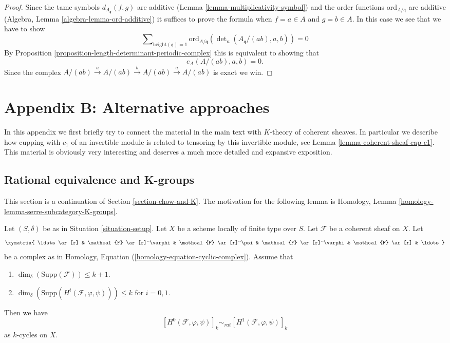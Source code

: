 \begin{proof}
Since the tame symbols $d_{A_{\mathfrak q}}(f, g)$ are additive
(Lemma \ref{lemma-multiplicativity-symbol}) and the order
functions $\text{ord}_{A/\mathfrak q}$
are additive (Algebra, Lemma \ref{algebra-lemma-ord-additive})
it suffices to prove the formula when $f = a \in A$ and
$g = b \in A$. In this case we see that we have to show
$$
\sum\nolimits_{\text{height}(\mathfrak q) = 1}
\text{ord}_{A/\mathfrak q}(\det\nolimits_\kappa(A_{\mathfrak q}/(ab), a, b))
= 0
$$
By Proposition \ref{proposition-length-determinant-periodic-complex}
this is equivalent to showing that
$$
e_A(A/(ab), a, b) = 0.
$$
Since the complex
$A/(ab) \xrightarrow{a} A/(ab) \xrightarrow{b} A/(ab) \xrightarrow{a} A/(ab)$
is exact we win.
\end{proof}





\section{Appendix B: Alternative approaches}
\label{section-appendix-chow}

\noindent
In this appendix we first briefly try to connect the material
in the main text with $K$-theory of coherent sheaves. In
particular we describe how cupping with $c_1$ of an invertible
module is related to tensoring by this invertible module, see
Lemma \ref{lemma-coherent-sheaf-cap-c1}.
This material is obviously very interesting and
deserves a much more detailed and expansive exposition.


\subsection{Rational equivalence and K-groups}
\label{subsection-rational-equivalence-K-groups}

\noindent
This section is a continuation of Section \ref{section-chow-and-K}.
The motivation for the following lemma is
Homology, Lemma \ref{homology-lemma-serre-subcategory-K-groups}.

\begin{lemma}
\label{lemma-maps-between-coherent-sheaves}
Let $(S, \delta)$ be as in Situation \ref{situation-setup}.
Let $X$ be a scheme locally of finite type over $S$.
Let $\mathcal{F}$ be a coherent sheaf on $X$.
Let
$$
\xymatrix{
\ldots \ar[r] &
\mathcal{F} \ar[r]^\varphi &
\mathcal{F} \ar[r]^\psi &
\mathcal{F} \ar[r]^\varphi &
\mathcal{F} \ar[r] & \ldots
}
$$
be a complex as in Homology, Equation (\ref{homology-equation-cyclic-complex}).
Assume that
\begin{enumerate}
\item $\dim_\delta(\text{Supp}(\mathcal{F})) \leq k + 1$.
\item $\dim_\delta(\text{Supp}(H^i(\mathcal{F}, \varphi, \psi))) \leq k$
for $i = 0, 1$.
\end{enumerate}
Then we have
$$
[H^0(\mathcal{F}, \varphi, \psi)]_k
\sim_{rat}
[H^1(\mathcal{F}, \varphi, \psi)]_k
$$
as $k$-cycles on $X$.
\end{lemma}

